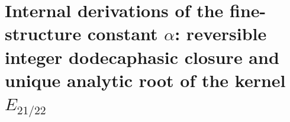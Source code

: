 \chapter{Internal derivations of the fine-structure constant \(\alpha\): reversible integer dodecaphasic closure and unique analytic root of the kernel \(E_{21/22}\)}
\label{chap:p3-final:31:dos_derivaciones_alpha}



